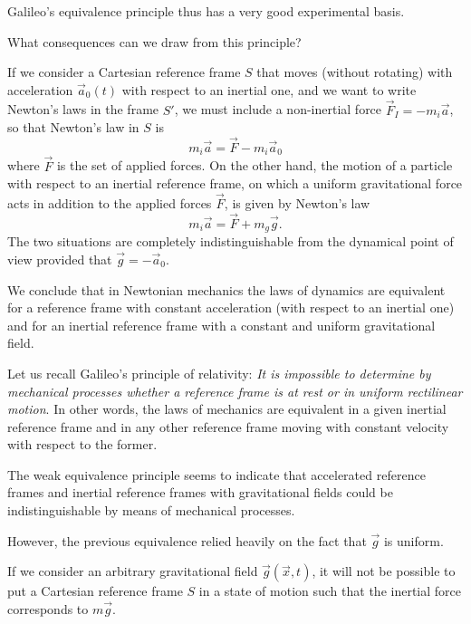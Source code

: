 \begin{points}
\item Galileo's equivalence principle thus has a very good experimental basis.

\item What consequences can we draw from this principle?

\item If we consider a Cartesian reference frame $S$ that moves (without rotating) with acceleration $\vec a_0(t)$ with respect to an inertial one, and we want to write Newton's laws in the frame $S'$, we must include a non-inertial force $\vec F_I=-m_i\vec a$, so that Newton's law in $S$ is
\[
  m_i\vec a=\vec F-m_i\vec a_0
\]
where $\vec F$ is the set of applied forces. On the other hand, the motion of a particle with respect to an inertial reference frame, on which a uniform gravitational force acts in addition to the applied forces $\vec F$, is given by Newton's law
\[
  m_i\vec a=\vec F+m_g\vec g .
\]
The two situations are completely indistinguishable from the dynamical point of view provided that $\vec g=-\vec a_0$.

\item We conclude that in Newtonian mechanics the laws of dynamics are equivalent for a reference frame with constant acceleration (with respect to an inertial one) and for an inertial reference frame with a constant and uniform gravitational field.

\item Let us recall Galileo's principle of relativity: \emph{It is impossible to determine by mechanical processes whether a reference frame is at rest or in uniform rectilinear motion}. In other words, the laws of mechanics are equivalent in a given inertial reference frame and in any other reference frame moving with constant velocity with respect to the former.

\item The weak equivalence principle seems to indicate that accelerated reference frames and inertial reference frames with gravitational fields could be indistinguishable by means of mechanical processes.

\item However, the previous equivalence relied heavily on the fact that $\vec g$ is uniform.

\item If we consider an arbitrary gravitational field $\vec g(\vec x,t)$, it will not be possible to put a Cartesian reference frame $S$ in a state of motion such that the inertial force corresponds to $m\vec g$.


\end{points}
